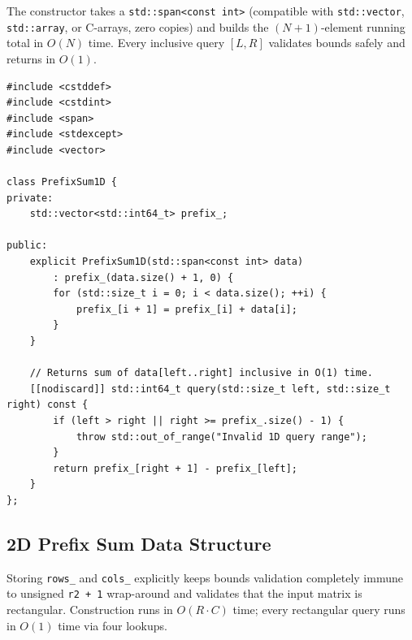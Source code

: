 \documentclass[11pt,a4paper]{article}
\theoremstyle{definition}
\begin{document}
The constructor takes a \texttt{std::span<const int>} (compatible with \texttt{std::vector}, \texttt{std::array}, or C-arrays, zero copies) and builds the $(N + 1)$-element running total in $O(N)$ time. Every inclusive query $[L, R]$ validates bounds safely and returns in $O(1)$.

\begin{lstlisting}[caption={1D Prefix Sum Data Structure with Safe Bounds Checking}]
#include <cstddef>
#include <cstdint>
#include <span>
#include <stdexcept>
#include <vector>

class PrefixSum1D {
private:
    std::vector<std::int64_t> prefix_;

public:
    explicit PrefixSum1D(std::span<const int> data)
        : prefix_(data.size() + 1, 0) {
        for (std::size_t i = 0; i < data.size(); ++i) {
            prefix_[i + 1] = prefix_[i] + data[i];
        }
    }

    // Returns sum of data[left..right] inclusive in O(1) time.
    [[nodiscard]] std::int64_t query(std::size_t left, std::size_t right) const {
        if (left > right || right >= prefix_.size() - 1) {
            throw std::out_of_range("Invalid 1D query range");
        }
        return prefix_[right + 1] - prefix_[left];
    }
};
\end{lstlisting}

\subsection{2D Prefix Sum Data Structure}

Storing \texttt{rows\_} and \texttt{cols\_} explicitly keeps bounds validation completely immune to unsigned \texttt{r2 + 1} wrap-around and validates that the input matrix is rectangular. Construction runs in $O(R \cdot C)$ time; every rectangular query runs in $O(1)$ time via four lookups.
\end{document}
